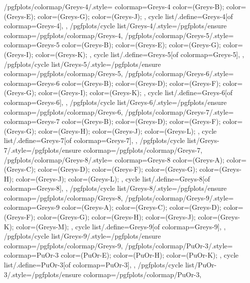 {  %
  /pgfplots/colormap/Greys-4/.style={
    colormap={Greys-4}{
      color=(Greys-B);
      color=(Greys-E);
      color=(Greys-G);
      color=(Greys-J);
    },
    cycle list/.define={Greys-4}{[of colormap=Greys-4]},
  },
  /pgfplots/cycle list/Greys-4/.style={/pgfplots/ensure colormap={/pgfplots/colormap/Greys-4}},
  /pgfplots/colormap/Greys-5/.style={
    colormap={Greys-5}{
      color=(Greys-B);
      color=(Greys-E);
      color=(Greys-G);
      color=(Greys-I);
      color=(Greys-K);
    },
    cycle list/.define={Greys-5}{[of colormap=Greys-5]},
  },
  /pgfplots/cycle list/Greys-5/.style={/pgfplots/ensure colormap={/pgfplots/colormap/Greys-5}},
  /pgfplots/colormap/Greys-6/.style={
    colormap={Greys-6}{
      color=(Greys-B);
      color=(Greys-D);
      color=(Greys-F);
      color=(Greys-G);
      color=(Greys-I);
      color=(Greys-K);
    },
    cycle list/.define={Greys-6}{[of colormap=Greys-6]},
  },
  /pgfplots/cycle list/Greys-6/.style={/pgfplots/ensure colormap={/pgfplots/colormap/Greys-6}},
  /pgfplots/colormap/Greys-7/.style={
    colormap={Greys-7}{
      color=(Greys-B);
      color=(Greys-D);
      color=(Greys-F);
      color=(Greys-G);
      color=(Greys-H);
      color=(Greys-J);
      color=(Greys-L);
    },
    cycle list/.define={Greys-7}{[of colormap=Greys-7]},
  },
  /pgfplots/cycle list/Greys-7/.style={/pgfplots/ensure colormap={/pgfplots/colormap/Greys-7}},
  /pgfplots/colormap/Greys-8/.style={
    colormap={Greys-8}{
      color=(Greys-A);
      color=(Greys-C);
      color=(Greys-D);
      color=(Greys-F);
      color=(Greys-G);
      color=(Greys-H);
      color=(Greys-J);
      color=(Greys-L);
    },
    cycle list/.define={Greys-8}{[of colormap=Greys-8]},
  },
  /pgfplots/cycle list/Greys-8/.style={/pgfplots/ensure colormap={/pgfplots/colormap/Greys-8}},
  /pgfplots/colormap/Greys-9/.style={
    colormap={Greys-9}{
      color=(Greys-A);
      color=(Greys-C);
      color=(Greys-D);
      color=(Greys-F);
      color=(Greys-G);
      color=(Greys-H);
      color=(Greys-J);
      color=(Greys-K);
      color=(Greys-M);
    },
    cycle list/.define={Greys-9}{[of colormap=Greys-9]},
  },
  /pgfplots/cycle list/Greys-9/.style={/pgfplots/ensure colormap={/pgfplots/colormap/Greys-9}},
  /pgfplots/colormap/PuOr-3/.style={
    colormap={PuOr-3}{
      color=(PuOr-E);
      color=(PuOr-H);
      color=(PuOr-K);
    },
    cycle list/.define={PuOr-3}{[of colormap=PuOr-3]},
  },
  /pgfplots/cycle list/PuOr-3/.style={/pgfplots/ensure colormap={/pgfplots/colormap/PuOr-3}},
}
